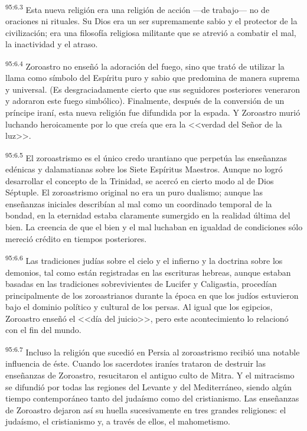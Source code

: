 \par
\textsuperscript{95:6.3} Esta nueva religión era una religión de acción ---de trabajo--- no de oraciones ni rituales. Su Dios era un ser supremamente sabio y el protector de la civilización; era una filosofía religiosa militante que se atrevió a combatir el mal, la inactividad y el atraso.

\par
\textsuperscript{95:6.4} Zoroastro no enseñó la adoración del fuego, sino que trató de utilizar la llama como símbolo del Espíritu puro y sabio que predomina de manera suprema y universal. (Es desgraciadamente cierto que sus seguidores posteriores veneraron y adoraron este fuego simbólico). Finalmente, después de la conversión de un príncipe iraní, esta nueva religión fue difundida por la espada. Y Zoroastro murió luchando heroicamente por lo que creía que era la <<verdad del Señor de la luz>>.

\par
\textsuperscript{95:6.5} El zoroastrismo es el único credo urantiano que perpetúa las enseñanzas edénicas y dalamatianas sobre los Siete Espíritus Maestros. Aunque no logró desarrollar el concepto de la Trinidad, se acercó en cierto modo al de Dios Séptuple. El zoroastrismo original no era un puro dualismo; aunque las enseñanzas iniciales describían al mal como un coordinado temporal de la bondad, en la eternidad estaba claramente sumergido en la realidad última del bien. La creencia de que el bien y el mal luchaban en igualdad de condiciones sólo mereció crédito en tiempos posteriores.

\par
\textsuperscript{95:6.6} Las tradiciones judías sobre el cielo y el infierno y la doctrina sobre los demonios, tal como están registradas en las escrituras hebreas, aunque estaban basadas en las tradiciones sobrevivientes de Lucifer y Caligastia, procedían principalmente de los zoroastrianos durante la época en que los judíos estuvieron bajo el dominio político y cultural de los persas. Al igual que los egipcios, Zoroastro enseñó el <<día del juicio>>, pero este acontecimiento lo relacionó con el fin del mundo.

\par
\textsuperscript{95:6.7} Incluso la religión que sucedió en Persia al zoroastrismo recibió una notable influencia de éste. Cuando los sacerdotes iraníes trataron de destruir las enseñanzas de Zoroastro, resucitaron el antiguo culto de Mitra. Y el mitracismo se difundió por todas las regiones del Levante y del Mediterráneo, siendo algún tiempo contemporáneo tanto del judaísmo como del cristianismo. Las enseñanzas de Zoroastro dejaron así su huella sucesivamente en tres grandes religiones: el judaísmo, el cristianismo y, a través de ellos, el mahometismo.


